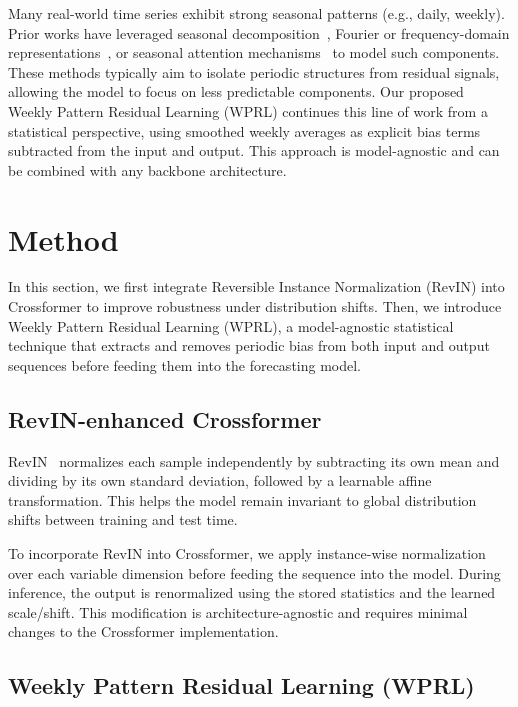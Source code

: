 \documentclass{article}
\begin{document}
Many real-world time series exhibit strong seasonal patterns (e.g., daily, weekly). Prior works have leveraged seasonal decomposition~\cite{cleveland1990stl}, Fourier or frequency-domain representations~\cite{wu2021autoformer}, or seasonal attention mechanisms~\cite{zhou2022fedformer} to model such components. These methods typically aim to isolate periodic structures from residual signals, allowing the model to focus on less predictable components. Our proposed Weekly Pattern Residual Learning (WPRL) continues this line of work from a statistical perspective, using smoothed weekly averages as explicit bias terms subtracted from the input and output. This approach is model-agnostic and can be combined with any backbone architecture.



\section{Method}

In this section, we first integrate Reversible Instance Normalization (RevIN) into Crossformer to improve robustness under distribution shifts. Then, we introduce Weekly Pattern Residual Learning (WPRL), a model-agnostic statistical technique that extracts and removes periodic bias from both input and output sequences before feeding them into the forecasting model.

\subsection{RevIN-enhanced Crossformer}

RevIN~\cite{kim2022reversible} normalizes each sample independently by subtracting its own mean and dividing by its own standard deviation, followed by a learnable affine transformation. This helps the model remain invariant to global distribution shifts between training and test time.

To incorporate RevIN into Crossformer, we apply instance-wise normalization over each variable dimension before feeding the sequence into the model. During inference, the output is renormalized using the stored statistics and the learned scale/shift. This modification is architecture-agnostic and requires minimal changes to the Crossformer implementation.

\subsection{Weekly Pattern Residual Learning (WPRL)}
\end{document}
